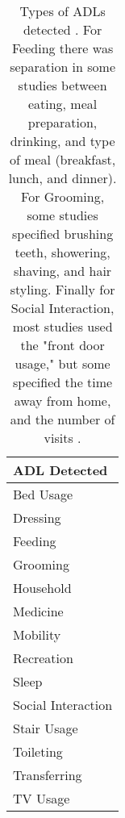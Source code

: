 \begin{table}[!ht]
    \centering
    \caption{Types of ADLs detected \cite{camp_technology_2021}. For Feeding there was separation in some studies between eating, meal preparation, drinking, and type of meal (breakfast, lunch, and dinner). For Grooming, some studies specified brushing teeth, showering, shaving, and hair styling. Finally for Social Interaction, most studies used the "front door usage," but some specified the time away from home, and the number of visits \cite{camp_technology_2021}.}
    \label{tab:camps-ADL}
    \begin{tabular}[pos]{ p{} }
        \toprule
        \textbf{ADL Detected} \\
        \midrule
        Bed Usage \\
        Dressing \\
        Feeding \\
        Grooming \\
        Household \\
        Medicine \\
        Mobility \\
        Recreation \\
        Sleep \\
        Social Interaction \\
        Stair Usage \\ 
        Toileting \\
        Transferring \\
        TV Usage \\
        \bottomrule 
    \end{tabular}
\end{table}

